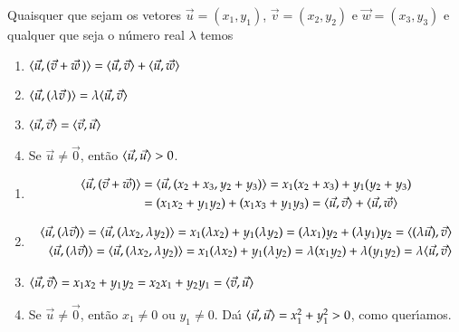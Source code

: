 \begin{proposicao}\label{propriedades-produto-interno}
  Quaisquer que sejam os vetores $\vec{u} = (x_1, y_1)$, $\vec{v} = (x_2, y_2)$ e $\vec{w} = (x_3, y_3)$ e qualquer que seja o n\'umero real $\lambda$ temos
  \begin{enumerate}[label=({\roman*})]
    \item\label{linearidade-produto-interno} $\langle \vec{u}, (\vec{v} + \vec{w}\,)\rangle = \langle \vec{u}, \vec{v} \rangle + \langle \vec{u}, \vec{w} \rangle$
    \item\label{linearidade2-produto-interno} $\langle \vec{u}, (\lambda \vec{v}\,)\rangle = \lambda\langle \vec{u}, \vec{v} \rangle$
    \item $\langle \vec{u}, \vec{v} \rangle = \langle \vec{v}, \vec{u} \rangle$
    \item Se $\vec{u} \ne \vec{0}$, ent\~ao $\langle \vec{u}, \vec{u} \rangle > 0$.
  \end{enumerate}
\end{proposicao}
\begin{prova}
  \begin{enumerate}[label=({\roman*})]
    \item \begin{align*}
      \langle\vec{u}, (\vec{v} + \vec{w})\rangle &= \langle\vec{u}, (x_2 + x_3, y_2 + y_3)\rangle = x_1(x_2 + x_3) + y_1(y_2 + y_3) \\ &= (x_1x_2 + y_1y_2) + (x_1x_3 + y_1y_3) = \langle \vec{u}, \vec{v} \rangle + \langle \vec{u}, \vec{w} \rangle
    \end{align*}
    \item \begin{align*}
      \langle\vec{u}, (\lambda\vec{v})\rangle = \langle\vec{u}, (\lambda x_2, \lambda y_2)\rangle = x_1(\lambda x_2) + y_1(\lambda y_2) = (\lambda x_1)y_2 + (\lambda y_1)y_2 = \langle(\lambda\vec{u}),\vec{v}\rangle\\
      \langle\vec{u},(\lambda\vec{v})\rangle = \langle\vec{u}, (\lambda x_2, \lambda y_2)\rangle = x_1(\lambda x_2) + y_1(\lambda y_2) = \lambda (x_1y_2) + \lambda (y_1y_2) = \lambda\langle \vec{u}, \vec{v} \rangle
    \end{align*}
    \item $\langle \vec{u}, \vec{v} \rangle = x_1x_2 + y_1y_2 = x_2x_1 + y_2y_1 = \langle \vec{v}, \vec{u} \rangle$
    \item Se $\vec{u} \ne \vec{0}$, ent\~ao $x_1 \ne 0$ ou $y_1 \ne 0$. Da{\'\i} $\langle \vec{u}, \vec{u} \rangle = x_1^2 + y_1^2 > 0$, como quer{\'\i}amos.
  \end{enumerate}
\end{prova}

